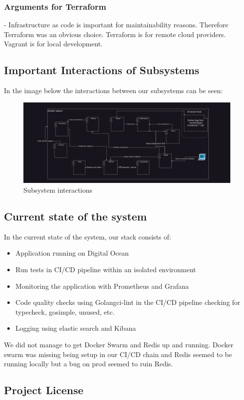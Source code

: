 \subsubsection{Arguments for Terraform}
- Infrastructure as code is important for maintainability reasons. Therefore Terraform was an obvious choice.
Terraform is for remote cloud providers. Vagrant is for local development. 

\subsection{Important Interactions of Subsystems}
In the image below the interactions between our subsystems can be seen:

\begin{figure}[H]
    \centering
    \captionsetup{justification=centering,margin=1cm}
    \includegraphics[width=0.8\linewidth]{report/images/InteractionsOfSystems.png}
    \caption{Subsystem interactions}
    \label{fig:minitwit}
\end{figure}

\subsection{Current state of the system}
In the current state of the system, our stack consists of: 
\begin{itemize}
    \item Application running on Digital Ocean
    \item Run tests in CI/CD pipeline within an isolated environment
    \item Monitoring the application with Prometheus and Grafana
    \item Code quality checks using Golangci-lint in the CI/CD pipeline checking for typecheck, gosimple, unused, etc.
    \item Logging using elastic search and Kibana
\end{itemize}
We did not manage to get Docker Swarm and Redis up and running. Docker swarm was missing being setup 
in our CI/CD chain and Redis seemed to be running locally but a bug on prod seemed to ruin Redis.

\subsection{Project License}
